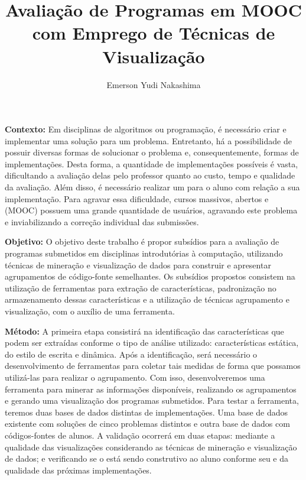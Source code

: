 \documentclass[12pt,english,brazil,a4paper,utf8,oneside]{utfpr-tcc}
\author{Emerson Yudi Nakashima}  %
\title{Avaliação de Programas em MOOC com Emprego de Técnicas de Visualização} %
\begin{document}
	
\frontmatter
\maketitle

\begin{resumo}
\textbf{Contexto:} Em disciplinas de algoritmos ou programação, é necessário criar
e implementar uma solução para um problema. Entretanto, há a possibilidade de possuir
diversas formas de solucionar o problema e, consequentemente, formas de implementações.
Desta forma, a quantidade de implementações possíveis é vasta, dificultando a avaliação
delas pelo professor quanto ao custo, tempo e qualidade da avaliação. Além disso, é
necessário realizar um  para o aluno com relação a sua implementação.
Para agravar essa dificuldade, cursos massivos, abertos e  (MOOC)
possuem uma grande quantidade de usuários, agravando este problema e inviabilizando
a correção individual das submissões.

\textbf{Objetivo:} O objetivo deste trabalho é propor subsídios para a avaliação de
programas submetidos em disciplinas introdutórias à computação, utilizando técnicas
de mineração e visualização de dados para construir e apresentar agrupamentos de
código-fonte semelhantes. Os subsídios propostos consistem na utilização de ferramentas
para extração de características, padronização no armazenamento dessas características
e a utilização de técnicas agrupamento e visualização, com o auxílio de uma ferramenta.

\textbf{Método:} A primeira etapa consistirá na identificação das características que
podem ser extraídas conforme o tipo de análise utilizado: características estática, do
estilo de escrita e dinâmica. Após a identificação, será necessário o desenvolvimento
de ferramentas para coletar tais medidas de forma que possamos utilizá-las para realizar
o agrupamento. Com isso, desenvolveremos uma ferramenta para minerar as informações
disponíveis, realizando os agrupamentos e gerando uma visualização dos programas submetidos.
Para testar a ferramenta, teremos duas bases de dados distintas de implementações. Uma
base de dados existente com soluções de cinco problemas distintos e outra base de dados
com códigos-fontes de alunos. A validação ocorrerá em duas etapas: mediante a qualidade
das visualizações considerando as técnicas de mineração e visualização de dados; e
verificando se o  está sendo construtivo ao aluno conforme seu
 e da qualidade das próximas implementações.


\end{resumo}
\end{document}
